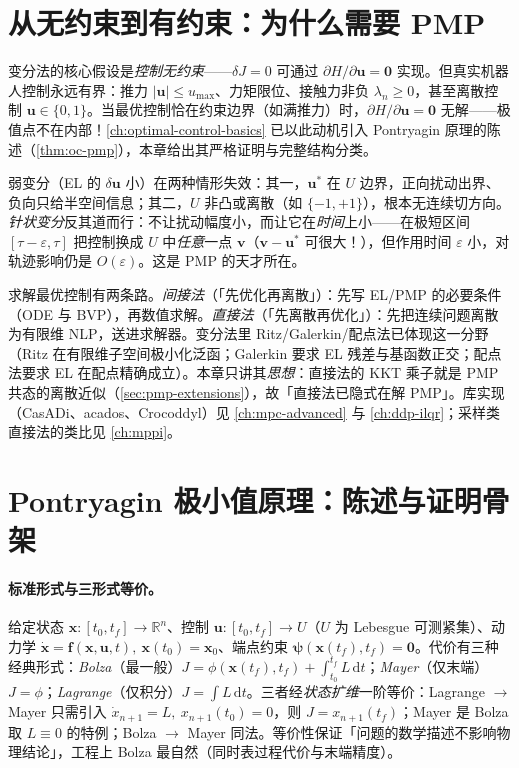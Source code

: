 \section{从无约束到有约束：为什么需要 PMP}
\label{sec:pmp-why}

变分法的核心假设是\emph{控制无约束}——$\delta J=0$ 可通过 $\partial H/\partial\mathbf u=\mathbf 0$ 实现。但真实机器人控制永远有界：推力 $|\mathbf u|\le u_{\max}$、力矩限位、接触力非负 $\lambda_n\ge0$，甚至离散控制 $\mathbf u\in\{0,1\}$。当最优控制恰在约束边界（如满推力）时，$\partial H/\partial\mathbf u=\mathbf 0$ 无解——极值点不在内部！\cref{ch:optimal-control-basics} 已以此动机引入 Pontryagin 原理的陈述（\cref{thm:oc-pmp}），本章给出其严格证明与完整结构分类。

弱变分（EL 的 $\delta\mathbf u$ 小）在两种情形失效：其一，$\mathbf u^\ast$ 在 $U$ 边界，正向扰动出界、负向只给半空间信息；其二，$U$ 非凸或离散（如 $\{-1,+1\}$），根本无连续切方向。\emph{针状变分}反其道而行：不让扰动幅度小，而让它在\emph{时间}上小——在极短区间 $[\tau-\varepsilon,\tau]$ 把控制换成 $U$ 中\emph{任意}一点 $\mathbf v$（$\mathbf v-\mathbf u^\ast$ 可很大！），但作用时间 $\varepsilon$ 小，对轨迹影响仍是 $O(\varepsilon)$。这是 PMP 的天才所在。

\begin{insight}
求解最优控制有两条路。\emph{间接法}（「先优化再离散」）：先写 EL/PMP 的必要条件（ODE 与 BVP），再数值求解。\emph{直接法}（「先离散再优化」）：先把连续问题离散为有限维 NLP，送进求解器。变分法里 Ritz/Galerkin/配点法已体现这一分野（Ritz 在有限维子空间极小化泛函；Galerkin 要求 EL 残差与基函数正交；配点法要求 EL 在配点精确成立）。本章只讲其\emph{思想}：直接法的 KKT 乘子就是 PMP 共态的离散近似（\cref{sec:pmp-extensions}），故「直接法已隐式在解 PMP」。库实现（CasADi、acados、Crocoddyl）见 \cref{ch:mpc-advanced} 与 \cref{ch:ddp-ilqr}；采样类直接法的类比见 \cref{ch:mppi}。
\end{insight}

\section{Pontryagin 极小值原理：陈述与证明骨架}
\label{sec:pmp-statement}

\paragraph{标准形式与三形式等价。}
给定状态 $\mathbf x:[t_0,t_f]\to\mathbb R^n$、控制 $\mathbf u:[t_0,t_f]\to U$（$U$ 为 Lebesgue 可测紧集）、动力学 $\dot{\mathbf x}=\mathbf f(\mathbf x,\mathbf u,t),\ \mathbf x(t_0)=\mathbf x_0$、端点约束 $\boldsymbol\psi(\mathbf x(t_f),t_f)=\mathbf 0$。代价有三种经典形式：\emph{Bolza}（最一般）$J=\phi(\mathbf x(t_f),t_f)+\int_{t_0}^{t_f}L\,\mathrm dt$；\emph{Mayer}（仅末端）$J=\phi$；\emph{Lagrange}（仅积分）$J=\int L\,\mathrm dt$。三者经\emph{状态扩维}一阶等价：Lagrange $\to$ Mayer 只需引入 $\dot x_{n+1}=L,\ x_{n+1}(t_0)=0$，则 $J=x_{n+1}(t_f)$；Mayer 是 Bolza 取 $L\equiv0$ 的特例；Bolza $\to$ Mayer 同法。等价性保证「问题的数学描述不影响物理结论」，工程上 Bolza 最自然（同时表过程代价与末端精度）。

